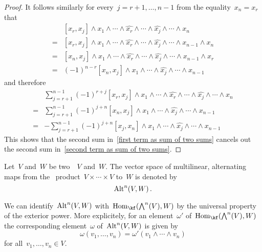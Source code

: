 \begin{proof}
  It follows similarly for every~$j = r+1, \dotsc, n-1$ from the equality~$x_n = x_r$ that
  \begin{align*}
    {}&
    [x_r, x_j] \wedge x_1 \wedge \dotsb \wedge \widehat{x_r} \wedge \dotsb \wedge \widehat{x_j} \wedge \dotsb \wedge x_n
    \\
    ={}&
    [x_r, x_j] \wedge x_1 \wedge \dotsb \wedge \widehat{x_r} \wedge \dotsb \wedge \widehat{x_j} \wedge \dotsb \wedge x_{n-1} \wedge x_n
    \\
    ={}&
    [x_n, x_j] \wedge x_1 \wedge \dotsb \wedge \widehat{x_r} \wedge \dotsb \wedge \widehat{x_j} \wedge \dotsb \wedge x_{n-1} \wedge x_r
    \\
    ={}&
    (-1)^{n-r}
    [x_n, x_j] \wedge x_1 \wedge \dotsb \wedge \widehat{x_j} \wedge \dotsb \wedge x_{n-1}
  \end{align*}
  and therefore
  \begin{align*}
    {}&
    \sum_{j = r+1}^{n-1}
    (-1)^{r+j}
    [x_r, x_j] \wedge x_1 \wedge \dotsb \wedge \widehat{x_r} \wedge \dotsb \wedge \widehat{x_j} \wedge \dotsb \wedge x_n
    \\
    ={}&
    \sum_{j = r+1}^{n-1}
    (-1)^{j+n}
    [x_n, x_j] \wedge x_1 \wedge \dotsb \wedge \widehat{x_j} \wedge \dotsb \wedge x_{n-1}
    \\
    ={}&
    -\sum_{j = r+1}^{n-1}
    (-1)^{j+n}
    [x_j, x_n] \wedge x_1 \wedge \dotsb \wedge \widehat{x_j} \wedge \dotsb \wedge x_{n-1}
  \end{align*}
  This shows that the second sum in~\eqref{first term as sum of two sums} cancels out the second sum in~\eqref{second term as sum of two sums}.
\end{proof}


\begin{definition}
  Let~$V$ and~$W$ be two~\vectorspaces{$\kf$}~$V$ and~$W$.
  The vector space of multilinear, alternating maps from the~ product~$V \times \dotsb \times V$ to~$W$ is denoted by
  \[
    \operatorname{Alt}^n(V,W) \,.
  \]
\end{definition}


\begin{recall}
  \label{expressing alt with exterior powers}
  We can identify~$\operatorname{Alt}^n(V, W)$ with~$\Hom_{\kf}( \Exterior^n(V), W)$ by the universal property of the exterior power.
  More explicitely, for an element~$\omega'$ of~$\Hom_{\kf}( \Exterior^n(V), W)$ the corresponding element~$\omega$ of~$\operatorname{Alt}^n(V,W)$ is given by
  \[
    \omega(v_1, \dotsc, v_n)
    =
    \omega'( v_1 \wedge \dotsb \wedge v_n )
  \]
  for all~$v_1, \dotsc, v_n \in V$.
\end{recall}


